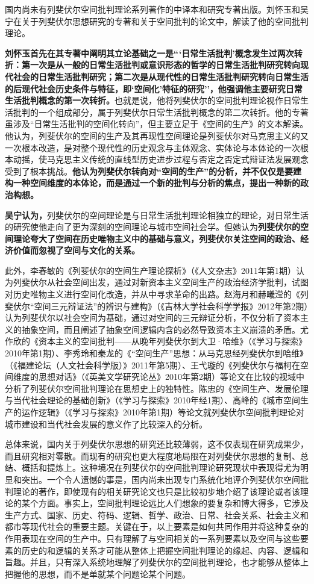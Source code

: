 \documentclass[UTF8, fontset = sourcesans, a4paper, oneside, zihao =
-4, scheme=chinese, no-math, space=true]{ctexbook}
\begin{document}
国内尚未有列斐伏尔空间批判理论系列著作的中译本和研究专著出版。刘怀玉和吴宁在关于列斐伏尔思想研究的专著和关于空间批判的论文中，解读了他的空间批判理论。

\textbf{刘怀玉首先在其专著中阐明其立论基础之一是```日常生活批判'概念发生过两次转折：第一次是从一般的日常生活批判或意识形态的哲学的日常生活批判研究转向现代社会的日常生活批判研究；第二次是从现代性的日常生活批判研究转向日常生活的后现代社会历史条件与特征，即`空间化'特征的研究''，他强调他主要研究日常生活批判概念的第一次转折。}也就是说，他将列斐伏尔的空间批判理论视作日常生活批判的一个组成部分，属于列斐伏尔日常生活批判概念的第二次转折。他的专著虽涉及``日常生活批判的空间化转向''，但主要立足于《空间的生产》的文本解读。他认为，列斐伏尔的空间的生产及其再现性空间理论是列斐伏尔对马克思主义的又一次根本改造，是对整个现代性的历史观念与主体观念、实体论与本体论的一次根本动摇，使马克思主义传统的直线型历史进步过程与否定之否定式辩证法发展观念受到了根本挑战。\textbf{他认为列斐伏尔转向对``空间的生产''的分析，并不仅仅是要建构一种空间维度的本体论，而是通过一个新的批判与分析的焦点，提出一种新的政治构想。}

\textbf{吴宁认为，}列斐伏尔的空间理论是与日常生活批判理论相独立的理论，对日常生活的研究使他走向了更为深刻的空间理论与城市空间社会学。但她认为\textbf{列斐伏尔的空间理论夸大了空间在历史唯物主义中的基础与意义，列斐伏尔关注空间的政治、经济价值而忽视了空间与文化的关系。}

此外，李春敏的《列斐伏尔的空间生产理论探析》（《人文杂志》2011年第1期）认为列斐伏尔从社会空间出发，通过对新资本主义空间生产的政治经济学批判，试图对历史唯物主义进行空间化改造，并从中寻求革命的出路。赵海月和赫曦滢的《列斐伏尔``空间三元辩证法''的辨识与建构》（《吉林大学社会科学学报》2012年第2期）认为列斐伏尔以社会空间为基础，通过对空间的三元辩证分析，不仅分析了资本主义的抽象空间，而且阐述了抽象空间逻辑内含的必然导致资本主义崩溃的矛盾。尤作欣的《资本主义的空间批判------从晚年列斐伏尔到大卫·哈维》（《学习与探索》2010年第1期）、李秀玲和秦龙的《``空间生产''思想：从马克思经列斐伏尔到哈维》（《福建论坛（人文社会科学版）》2011年第5期）、王弋璇的《列斐伏尔与福柯在空间维度的思想对话》（《英美文学研究论丛》2010年第2期）等论文在比较的视域中分析了列斐伏尔空间批判理论在思想史上的独特性。陈忠的《空间生产、发展伦理与当代社会理论的基础创新》（《学习与探索》2010年经1期）、高峰的《城市空间生产的运作逻辑》（《学习与探索》2010年第1期）等论文就列斐伏尔空间批判理论对城市建设和当代社会发展的意义作了比较深入的分析。

总体来说，国内关于列斐伏尔思想的研究还比较薄弱，这不仅表现在研究成果少，而且研究相对零散。而现有的研究也更大程度地局限在对列斐伏尔思想的复制、总结、概括和提炼上。这种境况在列斐伏尔的空间批判理论研究现状中表现得尤为明显和突出。一个令人遗憾的事是，国内尚未出现专门系统化地评介列斐伏尔空间批判理论的著作，即使现有的相关研究论文也只是比较初步地介绍了该理论或者该理论的某个方面。事实上，空间批判理论远比人们想象的要复杂和博大得多，它涉及生产方式、国家、历史、符码、逻辑、哲学、政治、日常、社会关系、社会主义和都市等现代社会的重要主题。关键在于，以上要素是如何共同作用并将这种复杂的作用表现在空间的生产中。只有理解了与空间相关的一系列要素以及空间与这些要素的历史的和逻辑的关系才可能从整体上把握空间批判理论的缘起、内容、逻辑和旨趣。并且，只有深入系统地理解了列斐伏尔的空间批判理论，也才能够从整体上把握他的思想，而不是单就某个问题论某个问题。
\end{document}
